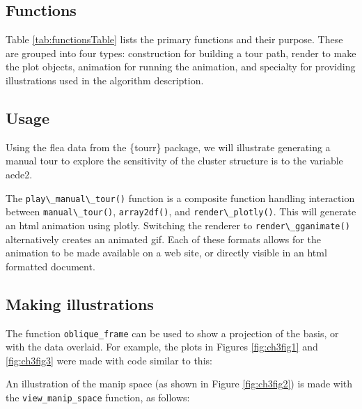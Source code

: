 \documentclass{template/monashthesis}
\begin{document}
\hypertarget{functions}{%
\subsection{Functions}\label{functions}}

Table \ref{tab:functionsTable} lists the primary functions and their purpose. These are grouped into four types: construction for building a tour path, render to make the plot objects, animation for running the animation, and specialty for providing illustrations used in the algorithm description.

\hypertarget{sec:usage}{%
\subsection{Usage}\label{sec:usage}}

Using the flea data from the \{tourr\} package, we will illustrate generating a manual tour to explore the sensitivity of the cluster structure is to the variable aede2.

\noindent The \texttt{play\textbackslash{}\_manual\textbackslash{}\_tour()} function is a composite function handling interaction between \texttt{manual\textbackslash{}\_tour()}, \texttt{array2df()}, and \texttt{render\textbackslash{}\_plotly()}. This will generate an html animation using plotly. Switching the renderer to \texttt{render\textbackslash{}\_gganimate()} alternatively creates an animated gif. Each of these formats allows for the animation to be made available on a web site, or directly visible in an html formatted document.

\hypertarget{making-illustrations}{%
\subsection{Making illustrations}\label{making-illustrations}}

The function \texttt{oblique\_frame} can be used to show a projection of the basis, or with the data overlaid. For example, the plots in Figures \ref{fig:ch3fig1} and \ref{fig:ch3fig3} were made with code similar to this:

\noindent An illustration of the manip space (as shown in Figure \ref{fig:ch3fig2}) is made with the \texttt{view\_manip\_space} function, as follows:

\begin{Shaded}
\begin{Highlighting}[]
\NormalTok{(}
                  
\end{Highlighting}
\end{Shaded}
\end{document}
